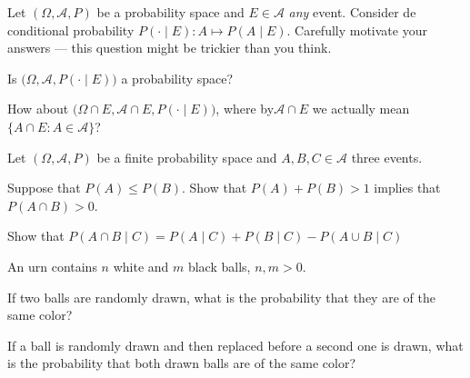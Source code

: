\documentclass[a4paper,10pt,landscape,twocolumn]{scrartcl}
\begin{document}
\begin{exercise}[]
  Let $(\Omega, \mathcal{A}, P)$ be a probability space and $E\in \mathcal{A}$
  \emph{any} event. Consider de conditional probability $P( \cdot \mid E): A
  \mapsto P(A\mid E)$. Carefully motivate your answers --- this question might
  be trickier than you think.
  
  \begin{subex}
    Is $\bigl(\Omega, \mathcal A, P(\cdot \mid E)\bigr)$ a probability space?	
  \end{subex}
  
  \begin{subex}
    How about $\bigl(\Omega\cap E, \mathcal A\cap E, P(\cdot \mid E)\bigr)$,
    where by$\mathcal A \cap E$ we actually mean 
    $\{ A\cap E: A \in \mathcal A\}$?
  \end{subex}
\end{exercise}


\begin{exercise}[]
  Let $(\Omega, \mathcal{A}, P)$ be a finite probability space and 
  $A, B, C \in \mathcal A$ three events.
  
  \begin{subex}
    Suppose that $P(A) \le P(B)$. Show that $P(A) + P(B) > 1$ implies that
    $P(A\cap B) > 0$.
  \end{subex}
	
  \begin{subex}
    Show that $P(A \cap B \mid C) = {P}(A\mid C) + {P}(B\mid C) - {P}(A \cup B
    \mid C)$ 
  \end{subex}
\end{exercise}


\begin{exercise}[]
  An urn contains $n$ white and $m$ black balls, $n, m > 0$.
  
  \begin{subex}
    If two balls are randomly drawn, what is the probability that they are of
    the same color?
  \end{subex}
  
  \begin{subex}
    If a ball is randomly drawn and then replaced before a second one is drawn,
    what is the probability that both drawn balls are of the same color?
  \end{subex}	
\end{exercise}
\end{document}
